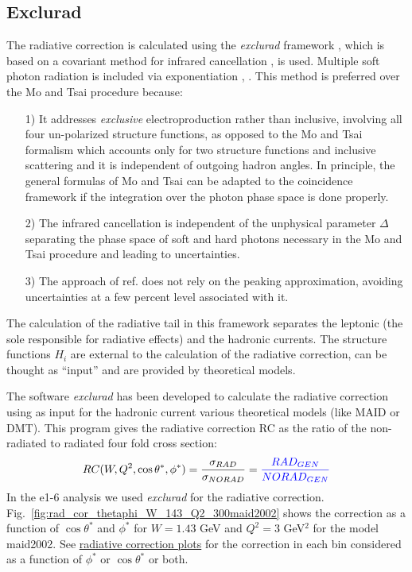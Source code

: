 \clearpage\newpage
\subsection{Exclurad}
The radiative correction is calculated using the {\it exclurad} framework \cite{bib:radcorr},
which is based on a covariant method for infrared cancellation \cite{bib:radinfra}, is used.
Multiple soft photon radiation is included via exponentiation \cite{bib:shum}, \cite{bib:YFS}.
This method is preferred over the Mo and Tsai procedure \cite{bib:motsai} because:

\begin{itemize}
\item[1)] It addresses {\it exclusive} electroproduction rather than inclusive,
          involving all four un-polarized structure functions, as opposed to
          the Mo and Tsai formalism which accounts only for two structure functions
          and inclusive scattering and it is independent of outgoing hadron angles.
          In principle, the general formulas of Mo and Tsai can be adapted to the
          coincidence framework if the integration over the photon phase space is done properly.
\item[2)] The infrared cancellation is independent of the unphysical parameter $\Delta$
          separating the phase space of soft and hard photons necessary in the Mo and
          Tsai procedure and leading to uncertainties.
\item[3)] The approach of ref. \cite{bib:radcorr} does not rely on the peaking approximation,
          avoiding uncertainties at a few percent level associated with it.

\end{itemize}

The calculation of the radiative tail in this
framework separates the leptonic (the sole responsible for radiative effects)
and the hadronic currents. The structure functions $H_i$ are external to the
calculation of the radiative correction, can be thought as ``input'' and are provided
by theoretical models. 



The software {\it exclurad} \cite{bib:radcorr} has been developed to
calculate the radiative correction using as input for the hadronic current
various theoretical models (like MAID or DMT).
This program gives the radiative correction RC as the ratio
of the non-radiated to radiated four fold cross section:
$$
	RC(W, Q^2, \cos\theta^*, \phi^*) =\frac{\sigma_{RAD}}{\sigma_{NORAD}} = \textcolor{blue}{\frac{RAD_{GEN}}{NORAD_{GEN}}}
$$
In the e1-6 analysis we used {\it exclurad} for the radiative correction.
Fig.~\ref{fig:rad_cor_thetaphi_W_143_Q2_300maid2002} shows the correction as a function
of $\cos\theta^*$ and $\phi^*$ for $W=1.43$ GeV and $Q^2=3$ GeV$^2$ for the model maid2002.
See   \href{http://www.jlab.org/~ungaro/maureepage/proj/pi0/distributions/radiative_correction.html}
{radiative correction plots} for the correction in each bin considered as a function of $\phi^*$ or
$\cos\theta^*$ or both.

